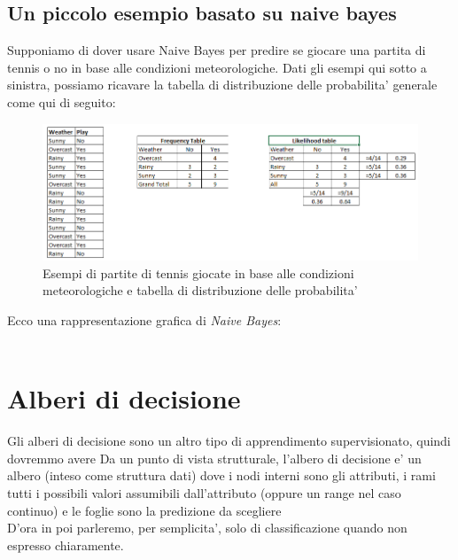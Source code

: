\subsection*{Un piccolo esempio basato su naive bayes}
Supponiamo di dover usare Naive Bayes per predire se giocare una partita di tennis o no in base alle condizioni meteorologiche. Dati gli esempi qui sotto a sinistra, possiamo ricavare la tabella di distribuzione delle probabilita' generale come qui di seguito:
\begin{figure}[H]
	\centering
	\includegraphics[width=0.7\linewidth]{img/Bayes_tennis_sample}
	\caption{Esempi di partite di tennis giocate in base alle condizioni meteorologiche e tabella di distribuzione delle probabilita'}
	\label{}
\end{figure}
\medskip
Ecco una rappresentazione grafica di \textit{Naive Bayes}:\\\\
\section*{Alberi di decisione}
Gli alberi di decisione sono un altro tipo di apprendimento supervisionato, quindi dovremmo avere 
Da un punto di vista strutturale, l'albero di decisione e' un albero (inteso come struttura dati) dove i nodi interni sono gli attributi, i rami tutti i possibili valori assumibili dall'attributo (oppure un range nel caso continuo) e le foglie sono la predizione da scegliere\\D'ora in poi parleremo, per semplicita', solo di classificazione quando non espresso chiaramente.


